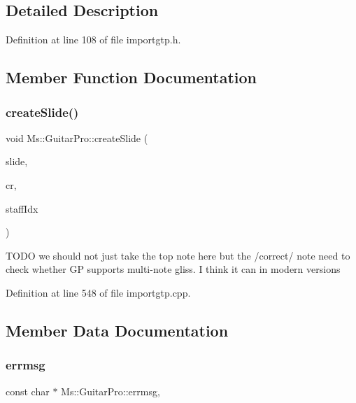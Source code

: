 \subsection{Detailed Description}


Definition at line 108 of file importgtp.\+h.



\subsection{Member Function Documentation}
\mbox{\label{class_ms_1_1_guitar_pro_a6623aae1b412483122065e15fdc5e838}} 
\subsubsection{\texorpdfstring{create\+Slide()}{createSlide()}}
{\footnotesize\ttfamily void Ms\+::\+Guitar\+Pro\+::create\+Slide (\begin{DoxyParamCaption}\item[{int}]{slide,  }\item[{\hyperlink{class_ms_1_1_chord_rest}{Chord\+Rest} $\ast$}]{cr,  }\item[{int}]{staff\+Idx }\end{DoxyParamCaption})\hspace{0.3cm}{\ttfamily [protected]}}

T\+O\+DO we should not just take the top note here but the /correct/ note need to check whether GP supports multi-\/note gliss. I think it can in modern versions 

Definition at line 548 of file importgtp.\+cpp.



\subsection{Member Data Documentation}
\mbox{\label{class_ms_1_1_guitar_pro_ae39656bae71b44049964c2d67ca05190}} 
\subsubsection{\texorpdfstring{errmsg}{errmsg}}
{\footnotesize\ttfamily const char $\ast$ Ms\+::\+Guitar\+Pro\+::errmsg\hspace{0.3cm}{\ttfamily [static]}, {\ttfamily [protected]}}


